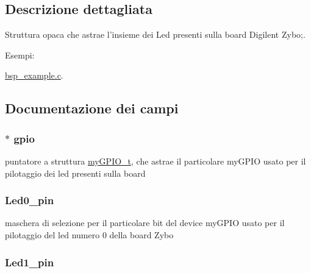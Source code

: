 \subsection{Descrizione dettagliata}
Struttura opaca che astrae l'insieme dei Led presenti sulla board Digilent Zybo;. \begin{Desc}
\item[Esempi\+: ]\par
\hyperlink{bsp_example_8c-example}{bsp\+\_\+example.\+c}.\end{Desc}


\subsection{Documentazione dei campi}
\hypertarget{struct_zybo_led__t_ac37ddc7c58d246d233dfb38037020184}{
\subsubsection[{gpio}]{$\ast$ gpio}}\label{struct_zybo_led__t_ac37ddc7c58d246d233dfb38037020184}
puntatore a struttura \hyperlink{structmy_g_p_i_o__t}{my\+G\+P\+I\+O\+\_\+t}, che astrae il particolare my\+G\+P\+I\+O usato per il pilotaggio dei led presenti sulla board \hypertarget{struct_zybo_led__t_ac5afef2eef91d5533a23435cfcc60104}{
\subsubsection[{Led0\+\_\+pin}]{ Led0\+\_\+pin}}\label{struct_zybo_led__t_ac5afef2eef91d5533a23435cfcc60104}
maschera di selezione per il particolare bit del device my\+G\+P\+I\+O usato per il pilotaggio del led numero 0 della board Zybo \hypertarget{struct_zybo_led__t_adc78fb167f1dd6693910813d4ec5930e}{
\subsubsection[{Led1\+\_\+pin}]{ Led1\+\_\+pin}}\label{struct_zybo_led__t_adc78fb167f1dd6693910813d4ec5930e}
